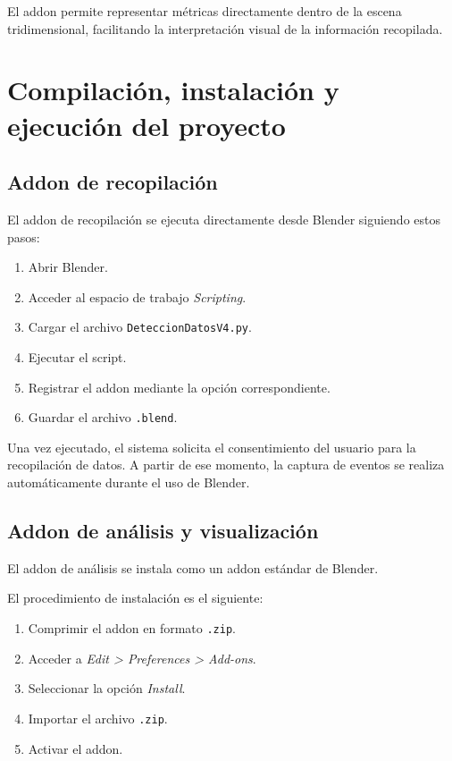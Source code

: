 El addon permite representar métricas directamente dentro de la escena tridimensional, facilitando la interpretación visual de la información recopilada.

\section{Compilación, instalación y ejecución del proyecto}

\subsection{Addon de recopilación}

El addon de recopilación se ejecuta directamente desde Blender siguiendo estos pasos:

\begin{enumerate}
    \item Abrir Blender.
    \item Acceder al espacio de trabajo \textit{Scripting}.
    \item Cargar el archivo \texttt{DeteccionDatosV4.py}.
    \item Ejecutar el script.
    \item Registrar el addon mediante la opción correspondiente.
    \item Guardar el archivo \texttt{.blend}.
\end{enumerate}

Una vez ejecutado, el sistema solicita el consentimiento del usuario para la recopilación de datos. A partir de ese momento, la captura de eventos se realiza automáticamente durante el uso de Blender.

\subsection{Addon de análisis y visualización}

El addon de análisis se instala como un addon estándar de Blender.

El procedimiento de instalación es el siguiente:

\begin{enumerate}
    \item Comprimir el addon en formato \texttt{.zip}.
    \item Acceder a \textit{Edit > Preferences > Add-ons}.
    \item Seleccionar la opción \textit{Install}.
    \item Importar el archivo \texttt{.zip}.
    \item Activar el addon.
\end{enumerate}

